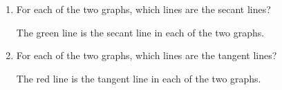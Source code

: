 \documentclass{ximera}
\begin{document}
\begin{problem}
\begin{enumerate}
    \item 
      For each of the two graphs, which lines are the secant lines?
      \begin{explanation}
        The green line is the secant line in each of the two graphs.        
      \end{explanation}

    \item 
      For each of the two graphs, which lines are the tangent lines?
      \begin{explanation}
        The red line is the tangent line in each of the two graphs.        
      \end{explanation}

  \end{enumerate}
\end{problem}
\end{document}
